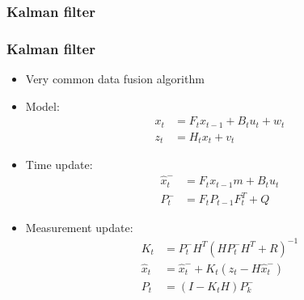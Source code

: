\documentclass[10pt,serif,t]{beamer}
\newenvironment{SubSubSlide}[1]
{
  \begin{frame}[fragile,environment=SubSubSlide]
    \frametitle{#1}
    \subsubsection{#1}
  }
  {
  \end{frame}
}
\begin{document}
\begin{SubSubSlide}{Kalman filter}
  \begin{itemize}
    \item
      Very common data fusion algorithm

      \vspace{1em}

      \pause

    \item
      Model:
      \begin{align*}
        x_{t} &= F_{t}x_{t-1} + B_{t}u_{t} + w_{t} \\
        z_{t} &= H_{t}x_{t} + v_{t}
      \end{align*}

    \item
      Time update:
      \begin{align*}
        \hat{x}^{-}_{t} &= F_{t}x_{t-1}m + B_{t}u_{t} \\
        P^{-}_{t} &= F_{t}P_{t-1}F_{t}^{T} + Q
      \end{align*}

    \item
      Measurement update:
      \begin{align*}
        K_{t} &= P^{-}_{t}H^{T}(HP^{-}_{t}H^{T} + R)^{-1}\\
        \hat{x}_{t} &= \hat{x}^{-}_{t} + K_{t}(z_{t} - H\hat{x}^{-}_{t}) \\
        P_{t} &= (I-K_{t}H)P^{-}_{k}
      \end{align*}

  \end{itemize}
\end{SubSubSlide}
\end{document}
